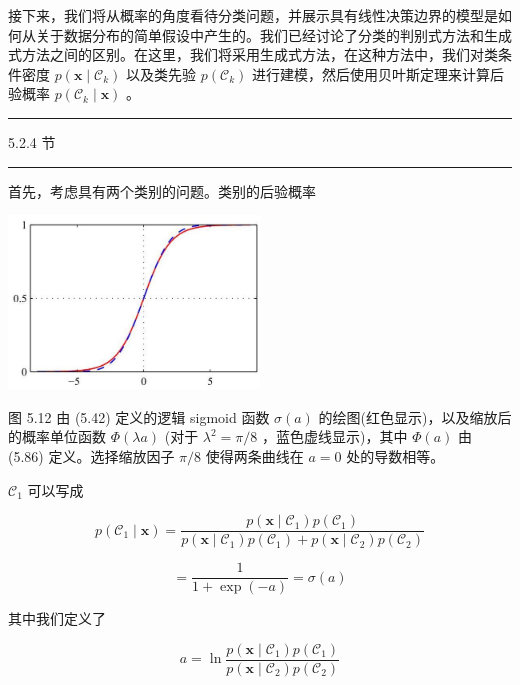 \documentclass[10pt]{article}
\newcommand{\HRule}{\begin{center}\rule{0.9\linewidth}{0.2mm}\end{center}}
\begin{document}
接下来，我们将从概率的角度看待分类问题，并展示具有线性决策边界的模型是如何从关于数据分布的简单假设中产生的。我们已经讨论了分类的判别式方法和生成式方法之间的区别。在这里，我们将采用生成式方法，在这种方法中，我们对类条件密度 \(p\left( {\mathbf{x} \mid  {\mathcal{C}}_{k}}\right)\) 以及类先验 \(p\left( {\mathcal{C}}_{k}\right)\) 进行建模，然后使用贝叶斯定理来计算后验概率 \(p\left( {{\mathcal{C}}_{k} \mid  \mathbf{x}}\right)\) 。

\HRule

5.2.4 节

\HRule

首先，考虑具有两个类别的问题。类别的后验概率

\begin{center}
\includegraphics[max width=0.5\textwidth]{images/0194e279-9b28-703a-88f4-c3ac21e2010d_170_909_359_630_435_0.jpg}
\end{center}
\hspace*{3em} 

图 5.12 由 (5.42) 定义的逻辑 sigmoid 函数 \(\sigma \left( a\right)\) 的绘图(红色显示)，以及缩放后的概率单位函数 \(\Phi \left( {\lambda a}\right)\) (对于 \({\lambda }^{2} = \pi /8\) ，蓝色虚线显示)，其中 \(\Phi \left( a\right)\) 由 (5.86) 定义。选择缩放因子 \(\pi /8\) 使得两条曲线在 \(a = 0\) 处的导数相等。

\({\mathcal{C}}_{1}\) 可以写成

\[
p\left( {{\mathcal{C}}_{1} \mid  \mathbf{x}}\right)  = \frac{p\left( {\mathbf{x} \mid  {\mathcal{C}}_{1}}\right) p\left( {\mathcal{C}}_{1}\right) }{p\left( {\mathbf{x} \mid  {\mathcal{C}}_{1}}\right) p\left( {\mathcal{C}}_{1}\right)  + p\left( {\mathbf{x} \mid  {\mathcal{C}}_{2}}\right) p\left( {\mathcal{C}}_{2}\right) }
\]

\[
= \frac{1}{1 + \exp \left( {-a}\right) } = \sigma \left( a\right)  \tag{5.40}
\]

其中我们定义了

\[
a = \ln \frac{p\left( {\mathbf{x} \mid  {\mathcal{C}}_{1}}\right) p\left( {\mathcal{C}}_{1}\right) }{p\left( {\mathbf{x} \mid  {\mathcal{C}}_{2}}\right) p\left( {\mathcal{C}}_{2}\right) } \tag{5.41}
\]
\end{document}
